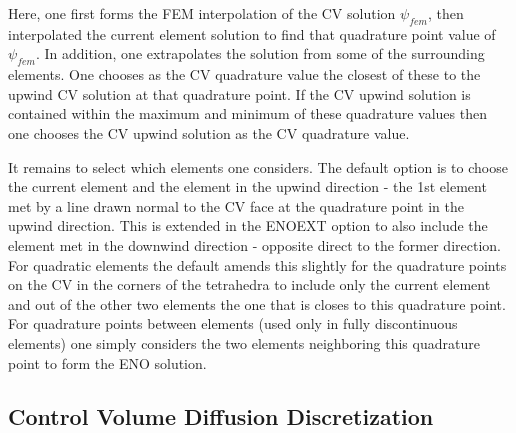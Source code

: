 Here, one first forms the FEM interpolation of the 
CV solution $\psi_{fem}$, then interpolated the current element 
solution to find that quadrature point value of $\psi_{fem}$. 
In addition, one extrapolates the solution from some of the surrounding elements. 
One chooses as the CV quadrature value the closest of these to the upwind CV solution at that 
quadrature point. 
If the CV upwind solution is contained within the maximum and minimum of these quadrature values 
then one chooses the CV upwind solution as the CV quadrature value. 

It remains to select which elements one considers. The default option is 
to choose the current element and the element in the upwind direction - the 1st element met by a line drawn 
normal to the CV face at the quadrature point in the upwind direction. 
This is extended in the ENOEXT option 
to also include the element met in the downwind direction - opposite direct to the former direction. 
For quadratic elements the default amends this slightly for the quadrature points on the CV 
in the corners of the tetrahedra to include only the current element and out of the other two elements the 
one that is closes to this quadrature point. 
For quadrature points between elements (used only in fully discontinuous elements) one simply considers the two 
elements neighboring this quadrature point to form the ENO solution.  




\subsection{Control Volume Diffusion Discretization}
\label{section_diff_discretisation}


